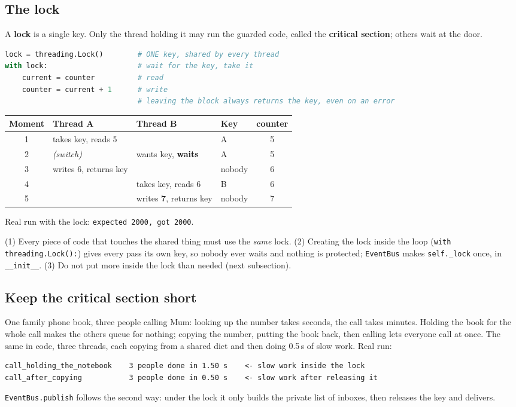 \documentclass[11pt,a4paper]{article}
\begin{document}
\subsection{The lock}
A \textbf{lock} is a single key. Only the thread holding it may run the guarded code, called the
\textbf{critical section}; others wait at the door.
\begin{lstlisting}[language=Python]
lock = threading.Lock()        # ONE key, shared by every thread
with lock:                     # wait for the key, take it
    current = counter          # read
    counter = current + 1      # write
                               # leaving the block always returns the key, even on an error
\end{lstlisting}
\begin{center}
\begin{tabularx}{\textwidth}{c X X l c}
\toprule
\textbf{Moment} & \textbf{Thread A} & \textbf{Thread B} & \textbf{Key} & \textbf{counter} \\
\midrule
1 & takes key, reads 5 & & A & 5 \\
2 & \emph{(switch)} & wants key, \textbf{waits} & A & 5 \\
3 & writes 6, returns key & & nobody & 6 \\
4 & & takes key, reads 6 & B & 6 \\
5 & & writes \textbf{7}, returns key & nobody & 7 \\
\bottomrule
\end{tabularx}
\end{center}
\noindent Real run with the lock: \texttt{expected 2000, got 2000}.

\begin{caution}
(1) Every piece of code that touches the shared thing must use the \emph{same} lock. (2) Creating
the lock inside the loop (\texttt{with threading.Lock():}) gives every pass its own key, so nobody
ever waits and nothing is protected; \texttt{EventBus} makes \texttt{self.\_lock} once, in
\texttt{\_\_init\_\_}. (3) Do not put more inside the lock than needed (next subsection).
\end{caution}

\subsection{Keep the critical section short}
One family phone book, three people calling Mum: looking up the number takes seconds, the call
takes minutes. Holding the book for the whole call makes the others queue for nothing; copying
the number, putting the book back, then calling lets everyone call at once. The same in code,
three threads, each copying from a shared dict and then doing 0.5\,s of slow work. Real run:
\begin{lstlisting}
call_holding_the_notebook    3 people done in 1.50 s    <- slow work inside the lock
call_after_copying           3 people done in 0.50 s    <- slow work after releasing it
\end{lstlisting}
\noindent \texttt{EventBus.publish} follows the second way: under the lock it only builds the
private list of inboxes, then releases the key and delivers.
\end{document}
